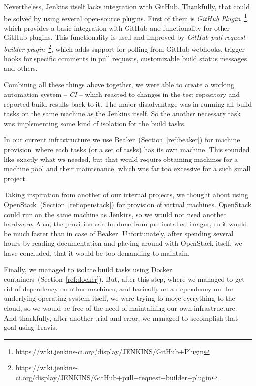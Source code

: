     Nevertheless, Jenkins itself lacks integration with GitHub. Thankfully, that
    could be solved by using several open-source plugins. First of them is
    \textit{GitHub Plugin}~\footnote{https://wiki.jenkins-ci.org/display/JENKINS/GitHub+Plugin},
    which provides a basic integration with GitHub and functionality for other
    GitHub plugins. This functionality is used and improved by
    \textit{GitHub pull request builder plugin}~\footnote{https://wiki.jenkins-ci.org/display/JENKINS/GitHub+pull+request+builder+plugin},
    which adds support for polling from GitHub webhooks, trigger hooks for
    specific comments in pull requests, customizable build status messages and
    others.

    Combining all these things above together, we were able to create a working
    automation system -- \textit{CI} -- which reacted to changes in the test
    repository and reported build results back to it. The major disadvantage
    was in running all build tasks on the same machine as the Jenkins itself.
    So the another necessary task was implementing some kind of isolation
    for the build tasks.

    In our current infrastructure we use Beaker~(Section~\ref{ref:beaker}) for machine
    provision, where each tasks (or a set of tasks) has its own machine. This sounded like exactly
    what we needed, but that would require obtaining machines for a machine pool
    and their maintenance, which was far too excessive for a such small project.

    Taking inspiration from another of our internal projects, we thought about
    using OpenStack~(Section~\ref{ref:openstack}) for provision of virtual
    machines. OpenStack could run on the same machine as Jenkins, so we would not
    need another hardware. Also, the provision can be done from pre-installed
    images, so it would be much faster than in case of Beaker. Unfortunately,
    after spending several hours by reading documentation and playing around with
    OpenStack itself, we have concluded, that it would be too demanding
    to maintain.

    Finally, we managed to isolate build tasks using Docker containers~(Section~\ref{ref:docker}).
    But, after this step, where we managed to get rid of dependency on other machines,
    and basically on a dependency on the underlying operating system itself, we
    were trying to move everything to the cloud, so we would be free
    of the need of maintaining our own infrastructure. And thankfully, after
    another trial and error, we managed to accomplish that goal using Travis.

